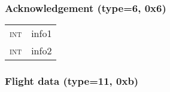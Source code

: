 \documentclass{article}
\newcommand{\gray}{\rowcolor[gray]{.92}}
\begin{document}
\vspace{0.4cm}
\subsubsection{Acknowledgement (type=6, 0x6)}
\begin{tabularx}{\linewidth}{>{\raggedleft\scshape\small}p{2.5cm}X}
int & info1\\
\gray int & info2\\
\end{tabularx}

\vspace{0.4cm}
\subsubsection{Flight data (type=11, 0xb)}
\end{document}

